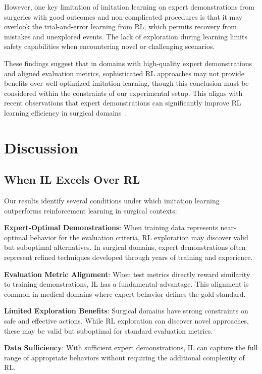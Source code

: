\documentclass[runningheads]{llncs}
\begin{document}
However, one key limitation of imitation learning on expert demonstrations from surgeries with good outcomes and non-complicated procedures is that it may overlook the trial-and-error learning from RL, which permits recovery from mistakes and unexplored events. The lack of exploration during learning limits safety capabilities when encountering novel or challenging scenarios.

These findings suggest that in domains with high-quality expert demonstrations and aligned evaluation metrics, sophisticated RL approaches may not provide benefits over well-optimized imitation learning, though this conclusion must be considered within the constraints of our experimental setup. This aligns with recent observations that expert demonstrations can significantly improve RL learning efficiency in surgical domains~\cite{liu2024surgical}.


\section{Discussion}

\subsection{When IL Excels Over RL}

Our results identify several conditions under which imitation learning outperforms reinforcement learning in surgical contexts:

\textbf{Expert-Optimal Demonstrations}: When training data represents near-optimal behavior for the evaluation criteria, RL exploration may discover valid but suboptimal alternatives. In surgical domains, expert demonstrations often represent refined techniques developed through years of training and experience.

\textbf{Evaluation Metric Alignment}: When test metrics directly reward similarity to training demonstrations, IL has a fundamental advantage. This alignment is common in medical domains where expert behavior defines the gold standard.

\textbf{Limited Exploration Benefits}: Surgical domains have strong constraints on safe and effective actions. While RL exploration can discover novel approaches, these may be valid but suboptimal for standard evaluation metrics.

\textbf{Data Sufficiency}: With sufficient expert demonstrations, IL can capture the full range of appropriate behaviors without requiring the additional complexity of RL.
\end{document}
